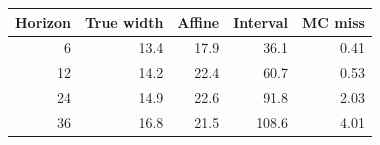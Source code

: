 \begin{tabular}{rrrrr}
\toprule
Horizon & True width & Affine & Interval & MC miss \\
\midrule
6 & 13.4 & 17.9 & 36.1 & 0.41 \\
12 & 14.2 & 22.4 & 60.7 & 0.53 \\
24 & 14.9 & 22.6 & 91.8 & 2.03 \\
36 & 16.8 & 21.5 & 108.6 & 4.01 \\
\bottomrule
\end{tabular}
